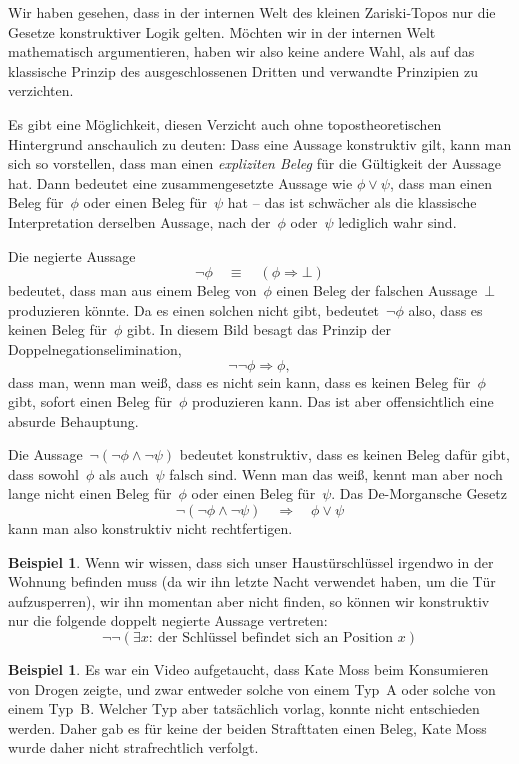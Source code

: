 \documentclass[a4paper,ngerman,12pt]{scrartcl}
\theoremstyle{definition}
\newtheorem{bsp}[defn]{Beispiel}
\theoremstyle{plain}
\theoremstyle{remark}
\renewcommand{\_}{\mathpunct{.}\,}
\newcommand{\?}{\,{:}\,}
\begin{document}
Wir haben gesehen, dass in der internen Welt des kleinen Zariski-Topos nur die
Gesetze konstruktiver Logik gelten. Möchten wir in der internen Welt
mathematisch argumentieren, haben wir also keine andere Wahl, als auf das
klassische Prinzip des ausgeschlossenen Dritten und verwandte Prinzipien zu
verzichten.

Es gibt eine Möglichkeit, diesen Verzicht auch ohne topostheoretischen
Hintergrund anschaulich zu deuten: Dass eine Aussage konstruktiv gilt, kann man
sich so vorstellen, dass man einen \emph{expliziten Beleg} für die Gültigkeit
der Aussage hat. Dann bedeutet eine zusammengesetzte Aussage
wie $\phi \vee \psi$,
dass man einen Beleg für~$\phi$ oder einen Beleg für~$\psi$ hat -- das ist
schwächer als die klassische Interpretation derselben Aussage, nach der~$\phi$
oder~$\psi$ lediglich wahr sind.

Die negierte Aussage
\[ \neg\phi \quad\equiv\quad (\phi \Rightarrow \bot) \]
bedeutet, dass man aus einem Beleg von~$\phi$ einen Beleg der falschen
Aussage~$\bot$ produzieren könnte. Da es einen solchen nicht gibt,
bedeutet~$\neg\phi$ also, dass es keinen Beleg für~$\phi$ gibt.
In diesem Bild besagt das Prinzip der Doppelnegationselimination,
\[ \neg\neg\phi \Longrightarrow \phi, \]
dass man, wenn man weiß, dass es nicht sein kann, dass es keinen Beleg
für~$\phi$ gibt, sofort einen Beleg für~$\phi$ produzieren kann. Das ist aber
offensichtlich eine absurde Behauptung.

Die Aussage~$\neg(\neg\phi \wedge \neg\psi)$ bedeutet konstruktiv, dass es
keinen Beleg dafür gibt, dass sowohl~$\phi$ als auch~$\psi$ falsch sind. Wenn
man das weiß, kennt man aber noch lange nicht einen Beleg für~$\phi$ oder einen
Beleg für~$\psi$. Das De-Morgansche Gesetz
\[ \neg(\neg\phi \wedge \neg\psi) \quad\Longrightarrow\quad \phi \vee \psi \]
kann man also konstruktiv nicht rechtfertigen.

\begin{bsp}Wenn wir wissen, dass sich unser Haustürschlüssel irgendwo in der
Wohnung befinden muss (da wir ihn letzte Nacht verwendet haben, um die Tür
aufzusperren), wir ihn momentan aber nicht finden, so können wir konstruktiv
nur die folgende doppelt negierte Aussage vertreten:
\[ \neg\neg (\exists x{:}\ \text{der Schlüssel befindet sich an Position~$x$})
\]
\end{bsp}

\begin{bsp}
Es war ein Video aufgetaucht, dass Kate Moss beim Konsumieren von Drogen zeigte,
und zwar entweder solche von einem Typ~A oder solche von einem Typ~B. Welcher
Typ aber tatsächlich vorlag, konnte nicht entschieden werden. Daher gab es für
keine der beiden Strafttaten einen Beleg, Kate Moss wurde daher nicht
strafrechtlich verfolgt.
\end{bsp}
\end{document}
